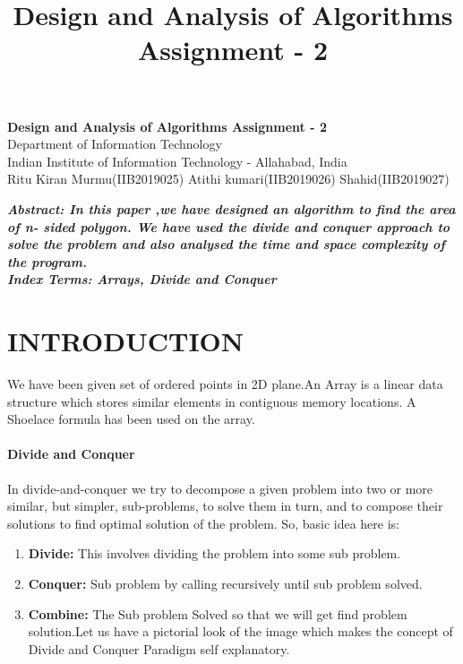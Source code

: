 \documentclass[10pt]{article}
\author{}
\title{\Large{Design and Analysis of Algorithms Assignment - 2}}
\begin{document}
	\begin{center}
		{\Large \textbf{Design and Analysis of Algorithms Assignment - 2}}\\
		\vspace{1em}
		{\large Department of Information Technology}\\
		\vspace{1em}
		\large{Indian Institute of Information Technology - Allahabad, India}\\
		\vspace{1em}
		\large{ Ritu Kiran Murmu(IIB2019025)      Atithi kumari(IIB2019026)     Shahid(IIB2019027)}
		\vspace{2.5em}
		
	\end{center}
	
\begin{multicols*}{2}

    \textbf{\emph{{Abstract}: In this paper ,we have designed an algorithm to find  the area of n- sided polygon. We have used the divide and conquer approach to solve the problem and also analysed the time and space complexity of the program.
}}\\
	
	\textbf{\emph{{Index Terms}: Arrays, Divide and Conquer\\}}


\section*{INTRODUCTION}
 
We have been given set of ordered points in 2D plane.An Array is a linear data structure which stores similar elements in contiguous memory locations. A Shoelace formula has been used on the array.

\paragraph{Divide and Conquer}
In divide-and-conquer  we try to decompose a given problem into two or more similar, but simpler, sub-problems, to solve them in turn, and to compose their solutions to find optimal solution of the problem. So, basic idea here is: 
\begin{enumerate}
    \item\textbf{Divide:} This involves dividing the problem into some sub problem.
    \item\textbf{Conquer:} Sub problem by calling recursively until sub problem solved.
    \item\textbf{Combine:} The Sub problem Solved so that we will get find problem solution.Let us have a pictorial look of the image which makes the concept of Divide and Conquer Paradigm self explanatory.\\\\
\end{enumerate}


\end{multicols*}
\end{document}
